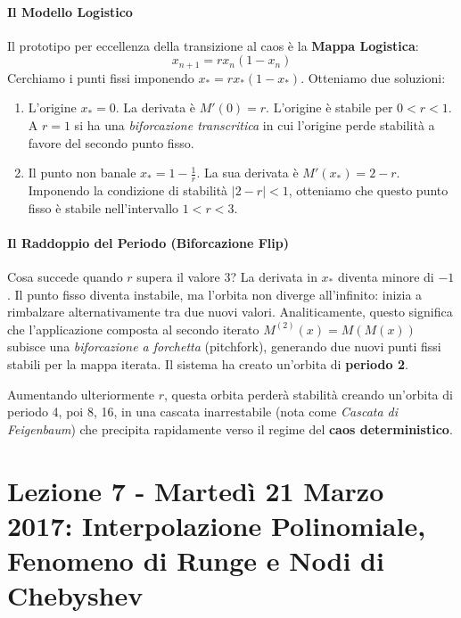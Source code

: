 \documentclass[12pt,a4paper]{article}
\begin{document}
\paragraph{Il Modello Logistico}
Il prototipo per eccellenza della transizione al caos è la \textbf{Mappa Logistica}:
\begin{equation}
x_{n+1} = r x_n (1 - x_n)
\end{equation}
Cerchiamo i punti fissi imponendo $x_* = r x_* (1 - x_*)$. Otteniamo due soluzioni:
\begin{enumerate}
    \item L'origine $x_* = 0$. La derivata è $M'(0) = r$. L'origine è stabile per $0 < r < 1$. A $r=1$ si ha una \textit{biforcazione transcritica} in cui l'origine perde stabilità a favore del secondo punto fisso.
    \item Il punto non banale $x_* = 1 - \frac{1}{r}$. La sua derivata è $M'(x_*) = 2 - r$. Imponendo la condizione di stabilità $|2 - r| < 1$, otteniamo che questo punto fisso è stabile nell'intervallo \textbf{$1 < r < 3$}.
\end{enumerate}

\paragraph{Il Raddoppio del Periodo (Biforcazione Flip)}
Cosa succede quando $r$ supera il valore 3? La derivata in $x_*$ diventa minore di $-1$. Il punto fisso diventa instabile, ma l'orbita non diverge all'infinito: inizia a rimbalzare alternativamente tra due nuovi valori. Analiticamente, questo significa che l'applicazione composta al secondo iterato $M^{(2)}(x) = M(M(x))$ subisce una \textit{biforcazione a forchetta} (pitchfork), generando due nuovi punti fissi stabili per la mappa iterata. Il sistema ha creato un'orbita di \textbf{periodo 2}. 

Aumentando ulteriormente $r$, questa orbita perderà stabilità creando un'orbita di periodo 4, poi 8, 16, in una cascata inarrestabile (nota come \textit{Cascata di Feigenbaum}) che precipita rapidamente verso il regime del \textbf{caos deterministico}.

\newpage
\section{Lezione 7 - Martedì 21 Marzo 2017: Interpolazione Polinomiale, Fenomeno di Runge e Nodi di Chebyshev}
\end{document}
